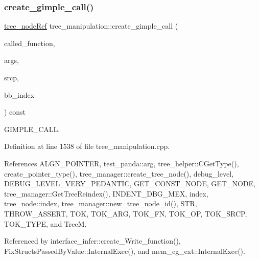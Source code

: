 \subsubsection{\texorpdfstring{create\+\_\+gimple\+\_\+call()}{create\_gimple\_call()}}
{\footnotesize\ttfamily \hyperlink{tree__node_8hpp_a6ee377554d1c4871ad66a337eaa67fd5}{tree\+\_\+node\+Ref} tree\+\_\+manipulation\+::create\+\_\+gimple\+\_\+call (\begin{DoxyParamCaption}\item[{const \hyperlink{tree__node_8hpp_a3cf5d02292c940f3892425a5b5fdec3c}{tree\+\_\+node\+Const\+Ref} \&}]{called\+\_\+function,  }\item[{const std\+::vector$<$ \hyperlink{tree__node_8hpp_a6ee377554d1c4871ad66a337eaa67fd5}{tree\+\_\+node\+Ref} $>$ \&}]{args,  }\item[{const std\+::string \&}]{srcp,  }\item[{const unsigned int}]{bb\+\_\+index }\end{DoxyParamCaption}) const}



G\+I\+M\+P\+L\+E\+\_\+\+C\+A\+LL. 



Definition at line 1538 of file tree\+\_\+manipulation.\+cpp.



References A\+L\+G\+N\+\_\+\+P\+O\+I\+N\+T\+ER, test\+\_\+panda\+::arg, tree\+\_\+helper\+::\+C\+Get\+Type(), create\+\_\+pointer\+\_\+type(), tree\+\_\+manager\+::create\+\_\+tree\+\_\+node(), debug\+\_\+level, D\+E\+B\+U\+G\+\_\+\+L\+E\+V\+E\+L\+\_\+\+V\+E\+R\+Y\+\_\+\+P\+E\+D\+A\+N\+T\+IC, G\+E\+T\+\_\+\+C\+O\+N\+S\+T\+\_\+\+N\+O\+DE, G\+E\+T\+\_\+\+N\+O\+DE, tree\+\_\+manager\+::\+Get\+Tree\+Reindex(), I\+N\+D\+E\+N\+T\+\_\+\+D\+B\+G\+\_\+\+M\+EX, index, tree\+\_\+node\+::index, tree\+\_\+manager\+::new\+\_\+tree\+\_\+node\+\_\+id(), S\+TR, T\+H\+R\+O\+W\+\_\+\+A\+S\+S\+E\+RT, T\+OK, T\+O\+K\+\_\+\+A\+RG, T\+O\+K\+\_\+\+FN, T\+O\+K\+\_\+\+OP, T\+O\+K\+\_\+\+S\+R\+CP, T\+O\+K\+\_\+\+T\+Y\+PE, and TreeM.



Referenced by interface\+\_\+infer\+::create\+\_\+\+Write\+\_\+function(), Fix\+Structs\+Passed\+By\+Value\+::\+Internal\+Exec(), and mem\+\_\+cg\+\_\+ext\+::\+Internal\+Exec().

